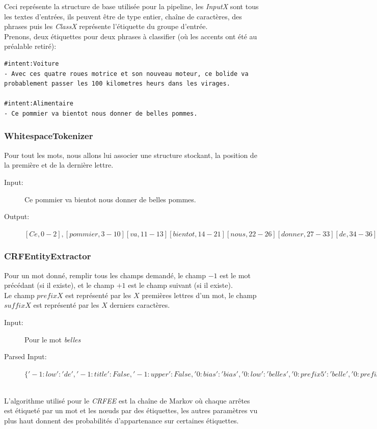 Ceci représente la structure de base utilisée pour la pipeline, les \textit{InputX} sont tous les textes d'entrées, ils peuvent être de type entier, chaîne de caractères, des phrases puis les \textit{ClassX} représente l'étiquette du groupe d'entrée.\\
Prenons, deux étiquettes pour deux phrases à classifier (où les accents ont été au préalable retiré):\\

\begin{lstlisting}
#intent:Voiture
- Avec ces quatre roues motrice et son nouveau moteur, ce bolide va probablement passer les 100 kilometres heurs dans les virages.

#intent:Alimentaire
- Ce pommier va bientot nous donner de belles pommes.
\end{lstlisting}

\subsubsection{WhitespaceTokenizer}
Pour tout les mots, nous allons lui associer une structure stockant, la position de la première et de la dernière lettre. 

\begin{description}
\item[Input:] Ce pommier va bientot nous donner de belles pommes.\\
\item[Output:] $[Ce,0-2],[pommier,3-10][va,11-13][bientot,14-21][nous,22-26][donner,27-33][de,34-36][belles,37-43][pommes,44-50]$
\end{description}

\pagebreak
\subsubsection{CRFEntityExtractor}
Pour un mot donné, remplir tous les champs demandé, le champ $-1$ est le mot précédant (si il existe), et le champ $+1$ est le champ suivant (si il existe).\\
Le champ $prefixX$ est représenté par les $X$ premières lettres d'un mot, le champ $suffixX$ est représenté par les $X$ derniers caractères.

\begin{description}
\item[Input:] Pour le mot \textit{belles}
\item[Parsed Input:] $\{'-1:low': 'de', '-1:title': False, '-1:upper': False, 
'0:bias': 'bias', '0:low': 'belles', '0:prefix5': 'belle', '0:prefix2': 
'be', '0:suffix5': 'elles', '0:suffix3': 'les', '0:suffix2': 'es', 
'0:upper': False, '0:title': False, '0:digit': False, '1:low': 'pommes',
'1:title': False, '1:upper': False\}$
\end{description}
\ \\
L'algorithme utilisé pour le \textit{CRFEE} est la chaîne de Markov où chaque arrêtes est étiqueté par un mot et les nœuds par des étiquettes, les autres paramètres vu plus haut donnent des probabilités d'appartenance sur certaines étiquettes.


